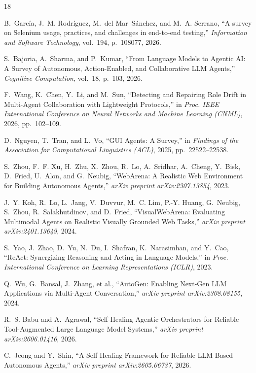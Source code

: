 \documentclass[conference]{IEEEtran}
\begin{document}
\begin{thebibliography}{18}

B.~Garc{\'i}a, J.~M. Rodr{\'i}guez, M.~del Mar~S{\'a}nchez, and M.~A. Serrano,
``A survey on Selenium usage, practices, and challenges in end-to-end testing,''
\textit{Information and Software Technology}, vol.~194, p.~108077, 2026.

S.~Bajoria, A.~Sharma, and P.~Kumar,
``From Language Models to Agentic AI: A Survey of Autonomous, Action-Enabled, and Collaborative LLM Agents,''
\textit{Cognitive Computation}, vol.~18, p.~103, 2026.

F.~Wang, K.~Chen, Y.~Li, and M.~Sun,
``Detecting and Repairing Role Drift in Multi-Agent Collaboration with Lightweight Protocols,''
in \textit{Proc. IEEE International Conference on Neural Networks and Machine Learning (CNML)}, 2026, pp.~102--109.

D.~Nguyen, T.~Tran, and L.~Vo,
``GUI Agents: A Survey,''
in \textit{Findings of the Association for Computational Linguistics (ACL)}, 2025, pp.~22522--22538.

S.~Zhou, F.~F. Xu, H.~Zhu, X.~Zhou, R.~Lo, A.~Sridhar, A.~Cheng, Y.~Bisk, D.~Fried, U.~Alon, and G.~Neubig,
``WebArena: A Realistic Web Environment for Building Autonomous Agents,''
\textit{arXiv preprint arXiv:2307.13854}, 2023.

J.~Y. Koh, R.~Lo, L.~Jang, V.~Duvvur, M.~C. Lim, P.-Y. Huang, G.~Neubig, S.~Zhou, R.~Salakhutdinov, and D.~Fried,
``VisualWebArena: Evaluating Multimodal Agents on Realistic Visually Grounded Web Tasks,''
\textit{arXiv preprint arXiv:2401.13649}, 2024.

S.~Yao, J.~Zhao, D.~Yu, N.~Du, I.~Shafran, K.~Narasimhan, and Y.~Cao,
``ReAct: Synergizing Reasoning and Acting in Language Models,''
in \textit{Proc. International Conference on Learning Representations (ICLR)}, 2023.

Q.~Wu, G.~Bansal, J.~Zhang, et al.,
``AutoGen: Enabling Next-Gen LLM Applications via Multi-Agent Conversation,''
\textit{arXiv preprint arXiv:2308.08155}, 2024.

R.~S. Babu and A.~Agrawal,
``Self-Healing Agentic Orchestrators for Reliable Tool-Augmented Large Language Model Systems,''
\textit{arXiv preprint arXiv:2606.01416}, 2026.

C.~Jeong and Y.~Shin,
``A Self-Healing Framework for Reliable LLM-Based Autonomous Agents,''
\textit{arXiv preprint arXiv:2605.06737}, 2026.


\end{thebibliography}
\end{document}
